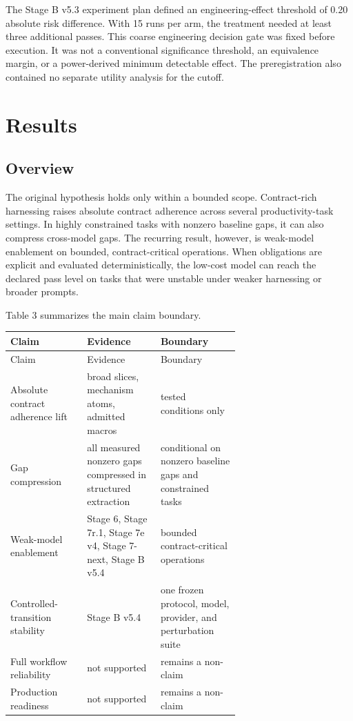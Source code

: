 \documentclass[11pt]{article}
\begin{document}
The Stage B v5.3 experiment plan defined an engineering-effect threshold of 0.20 absolute risk difference. With 15 runs per arm, the treatment needed at least three additional passes. This coarse engineering decision gate was fixed before execution. It was not a conventional significance threshold, an equivalence margin, or a power-derived minimum detectable effect. The preregistration also contained no separate utility analysis for the cutoff.

\section{Results}

\subsection{Overview}

The original hypothesis holds only within a bounded scope. Contract-rich harnessing raises absolute contract adherence across several productivity-task settings. In highly constrained tasks with nonzero baseline gaps, it can also compress cross-model gaps. The recurring result, however, is weak-model enablement on bounded, contract-critical operations. When obligations are explicit and evaluated deterministically, the low-cost model can reach the declared pass level on tasks that were unstable under weaker harnessing or broader prompts.

Table 3 summarizes the main claim boundary.

{\small
\setlength{\tabcolsep}{3pt}
\begin{longtable}{>{\raggedright\arraybackslash}p{0.220\linewidth}>{\raggedright\arraybackslash}p{0.220\linewidth}>{\raggedright\arraybackslash}p{0.220\linewidth}}
\toprule
Claim & Evidence & Boundary \\
\midrule
\endfirsthead
\toprule
Claim & Evidence & Boundary \\
\midrule
\endhead
Absolute contract adherence lift & broad slices, mechanism atoms, admitted macros & tested conditions only \\
Gap compression & all measured nonzero gaps compressed in structured extraction & conditional on nonzero baseline gaps and constrained tasks \\
Weak-model enablement & Stage 6, Stage 7r.1, Stage 7e v4, Stage 7-next, Stage B v5.4 & bounded contract-critical operations \\
Controlled-transition stability & Stage B v5.4 & one frozen protocol, model, provider, and perturbation suite \\
Full workflow reliability & not supported & remains a non-claim \\
Production readiness & not supported & remains a non-claim \\
\bottomrule
\end{longtable}
}
\end{document}
